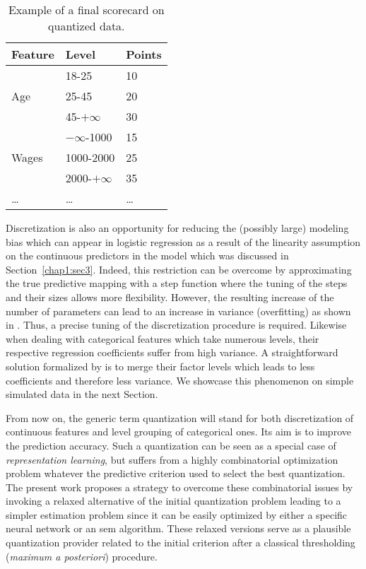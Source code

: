 \begin{table}
\centering
\begin{tabular}{p{3cm}|p{3cm}|p{2cm}}
Feature & Level & Points \\
\hline
\hline
\multirow{3}{*}{Age} & 18-25 & 10 \\
 & 25-45 & 20 \\
 & 45-$+\infty$ & 30 \\
 \hline
\multirow{3}{*}{Wages} & $-\infty$-1000 & 15 \\
 & 1000-2000 & 25 \\
 & 2000-$+\infty$ & 35 \\
 \dots & \dots & \dots \\
\end{tabular}
\caption{\label{tab:ex_scorecard} Example of a final scorecard on quantized data.}
\end{table}


Discretization is also an opportunity for reducing the (possibly large) modeling bias which can appear in logistic regression as a result of the linearity assumption on the continuous predictors in the model which was discussed in Section~\ref{chap1:sec3}. Indeed, this restriction can be overcome by approximating the true predictive mapping with a step function where the tuning of the steps and their sizes allows more flexibility. However, the resulting increase of the number of parameters can lead to an increase in variance (overfitting) as shown in \cite{yang2009discretization}. Thus, a precise tuning of the discretization procedure is required. Likewise when dealing with categorical features which take numerous levels, their respective regression coefficients suffer from high variance. A straightforward solution formalized by \cite{maj2015delete} is to merge their factor levels which leads to less coefficients and therefore less variance. We showcase this phenomenon on simple simulated data in the next Section.

From now on, the generic term quantization will stand for both discretization of continuous features and level grouping of categorical ones. Its aim is to improve the prediction accuracy. Such a quantization can be seen as a special case of \textit{representation learning}, but suffers from a highly combinatorial optimization problem whatever the predictive criterion used to select the best quantization. The present work proposes a strategy to overcome these combinatorial issues by invoking a relaxed alternative of the initial quantization problem leading to a simpler estimation problem since it can be easily optimized by either a specific neural network or an \gls{sem} algorithm. These relaxed versions serve as a plausible quantization provider related to the initial criterion after a classical thresholding (\textit{maximum a posteriori}) procedure.

